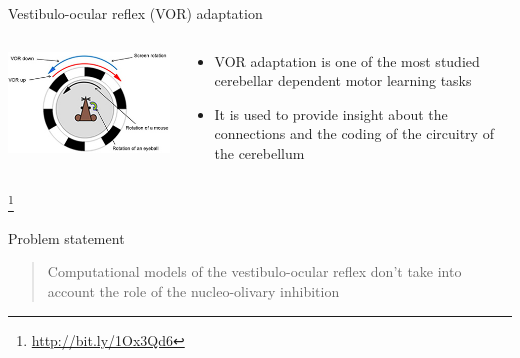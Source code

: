 \documentclass[ignorenonframetext,]{beamer}
\begin{document}
\begin{frame}{Vestibulo-ocular reflex (VOR) adaptation}

\begin{columns}[T]
\begin{column}[T]{5cm}
\includegraphics[]{images/13.jpg}
\end{column}
\begin{column}[T]{5cm} %
\begin{itemize}
\item VOR adaptation is one of the most studied cerebellar dependent motor learning tasks
\item It is used to provide insight about the connections and the coding of the circuitry of the cerebellum
\end{itemize}
\end{column}
\end{columns}

\footnote{\url{http://bit.ly/1Ox3Qd6}}

\end{frame}

\begin{frame}{Problem statement}

\begin{quote}
Computational models of the vestibulo-ocular reflex don't take into
account the role of the nucleo-olivary inhibition
\end{quote}

\end{frame}
\end{document}
